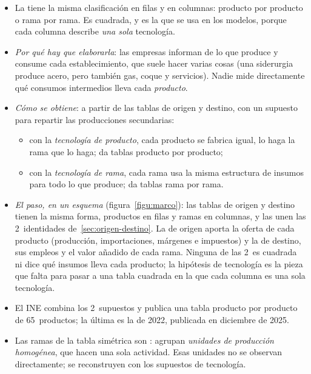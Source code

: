 \documentclass[11pt]{article}
\begin{document}
\begin{itemize}
\item La  tiene la misma clasificación en filas y en columnas: producto por producto o rama por rama. Es cuadrada, y es la que se usa en los modelos, porque cada columna describe \emph{una sola} tecnología.
\item \emph{Por qué hay que elaborarla}: las empresas informan de lo que produce y consume cada establecimiento, que suele hacer varias cosas (una siderurgia produce acero, pero también gas, coque y servicios). Nadie mide directamente qué consumos intermedios lleva cada \emph{producto}.
\item \emph{Cómo se obtiene}: a partir de las tablas de origen y destino, con un supuesto para repartir las producciones secundarias\nocite{Eurostat2008Manual}:
  \begin{itemize}
  \item con la \emph{tecnología de producto}, cada producto se fabrica igual, lo haga la rama que lo haga; da tablas producto por producto;
  \item con la \emph{tecnología de rama}, cada rama usa la misma estructura de insumos para todo lo que produce; da tablas rama por rama.
  \end{itemize}
\item \emph{El paso, en un esquema} (figura~\ref{figu:marco}): las tablas de origen y destino tienen la misma forma, productos en filas y ramas en columnas, y las unen las 2~identidades de~\ref{sec:origen-destino}. La de origen aporta la oferta de cada producto (producción, importaciones, márgenes e impuestos) y la de destino, sus empleos y el valor añadido de cada rama. Ninguna de las 2~es cuadrada ni dice qué insumos lleva cada producto; la hipótesis de tecnología es la pieza que falta para pasar a una tabla cuadrada en la que cada columna es una sola tecnología.
\item El INE combina los 2~supuestos y publica una tabla producto por producto de 65~productos; la última es la de 2022, publicada en diciembre de 2025\nocite{INE2025TIO2022}.
\item Las ramas de la tabla simétrica son : agrupan \emph{unidades de producción homogénea}, que hacen una sola actividad. Esas unidades no se observan directamente; se reconstruyen con los supuestos de tecnología\nocite{Eurostat2013SEC2010}.
\end{itemize}

\begin{infografia}[H]
\centering
\caption{Del marco de origen y destino a la tabla simétrica}\label{figu:marco}
\end{infografia}
\end{document}
